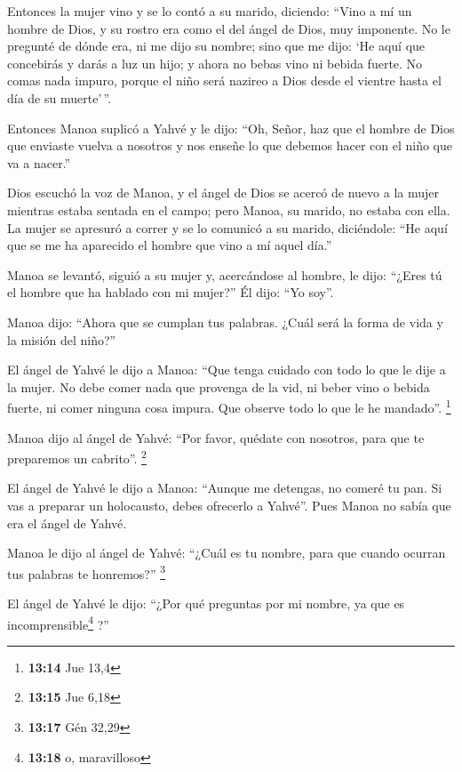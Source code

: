  Entonces la mujer vino y se lo contó a su marido,
diciendo: ``Vino a mí un hombre de Dios, y su rostro era como el del
ángel de Dios, muy imponente. No le pregunté de dónde era, ni me dijo su
nombre;  sino que me dijo: `He aquí que concebirás y darás
a luz un hijo; y ahora no bebas vino ni bebida fuerte. No comas nada
impuro, porque el niño será nazireo a Dios desde el vientre hasta el día
de su muerte'\,''.

 Entonces Manoa suplicó a Yahvé y le dijo: ``Oh, Señor,
haz que el hombre de Dios que enviaste vuelva a nosotros y nos enseñe lo
que debemos hacer con el niño que va a nacer.''

 Dios escuchó la voz de Manoa, y el ángel de Dios se
acercó de nuevo a la mujer mientras estaba sentada en el campo; pero
Manoa, su marido, no estaba con ella.  La mujer se
apresuró a correr y se lo comunicó a su marido, diciéndole: ``He aquí
que se me ha aparecido el hombre que vino a mí aquel día.''

 Manoa se levantó, siguió a su mujer y, acercándose al
hombre, le dijo: ``¿Eres tú el hombre que ha hablado con mi mujer?'' Él
dijo: ``Yo soy''.

 Manoa dijo: ``Ahora que se cumplan tus palabras. ¿Cuál
será la forma de vida y la misión del niño?''

 El ángel de Yahvé le dijo a Manoa: ``Que tenga cuidado
con todo lo que le dije a la mujer.  No debe comer nada
que provenga de la vid, ni beber vino o bebida fuerte, ni comer ninguna
cosa impura. Que observe todo lo que le he mandado''. \footnote{\textbf{13:14}
  Jue 13,4}

 Manoa dijo al ángel de Yahvé: ``Por favor, quédate con
nosotros, para que te preparemos un cabrito''. \footnote{\textbf{13:15}
  Jue 6,18}

 El ángel de Yahvé le dijo a Manoa: ``Aunque me detengas,
no comeré tu pan. Si vas a preparar un holocausto, debes ofrecerlo a
Yahvé''. Pues Manoa no sabía que era el ángel de Yahvé.

 Manoa le dijo al ángel de Yahvé: ``¿Cuál es tu nombre,
para que cuando ocurran tus palabras te honremos?'' \footnote{\textbf{13:17}
  Gén 32,29}

 El ángel de Yahvé le dijo: ``¿Por qué preguntas por mi
nombre, ya que es incomprensible\footnote{\textbf{13:18} o, maravilloso}
?''

